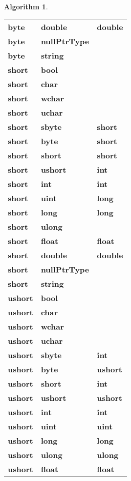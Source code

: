 \documentclass[a4paper,oneside,11pt]{book}
\theoremstyle{definition}
\newtheorem{algo}{Algorithm}[section]
\begin{document}
\begin{algo}
\begin{flushleft}
\begin{supertabular}{lll}
\textbf{byte}& \textbf{double}& \textbf{double}\\
\textbf{byte}& \textbf{nullPtrType}& \\
\textbf{byte}& \textbf{string}& \\
\hline
\textbf{short}& \textbf{bool}& \\
\textbf{short}& \textbf{char}& \\
\textbf{short}& \textbf{wchar}& \\
\textbf{short}& \textbf{uchar}& \\
\textbf{short}& \textbf{sbyte}& \textbf{short}\\
\textbf{short}& \textbf{byte}& \textbf{short}\\
\textbf{short}& \textbf{short}& \textbf{short}\\
\textbf{short}& \textbf{ushort}& \textbf{int}\\
\textbf{short}& \textbf{int}& \textbf{int}\\
\textbf{short}& \textbf{uint}& \textbf{long}\\
\textbf{short}& \textbf{long}& \textbf{long}\\
\textbf{short}& \textbf{ulong}& \\
\textbf{short}& \textbf{float}& \textbf{float}\\
\textbf{short}& \textbf{double}& \textbf{double}\\
\textbf{short}& \textbf{nullPtrType}& \\
\textbf{short}& \textbf{string}& \\
\hline
\textbf{ushort}& \textbf{bool}& \\
\textbf{ushort}& \textbf{char}& \\
\textbf{ushort}& \textbf{wchar}& \\
\textbf{ushort}& \textbf{uchar}& \\
\textbf{ushort}& \textbf{sbyte}& \textbf{int}\\
\textbf{ushort}& \textbf{byte}& \textbf{ushort}\\
\textbf{ushort}& \textbf{short}& \textbf{int}\\
\textbf{ushort}& \textbf{ushort}& \textbf{ushort}\\
\textbf{ushort}& \textbf{int}& \textbf{int}\\
\textbf{ushort}& \textbf{uint}& \textbf{uint}\\
\textbf{ushort}& \textbf{long}& \textbf{long}\\
\textbf{ushort}& \textbf{ulong}& \textbf{ulong}\\
\textbf{ushort}& \textbf{float}& \textbf{float}\\

\end{supertabular}
\end{flushleft}
\end{algo}
\end{document}

